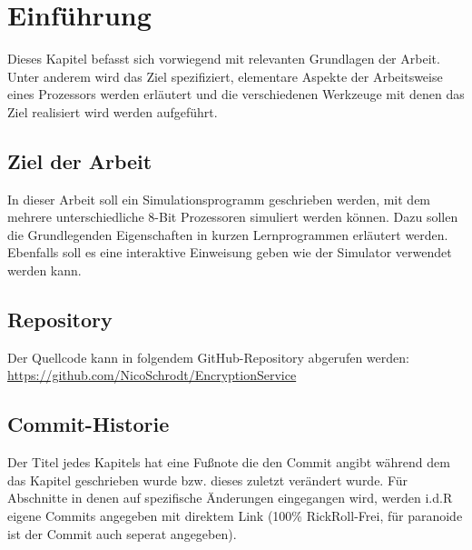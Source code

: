 \documentclass[12pt]{article}
\begin{document}
\clearpairofpagestyles
\clearmainofpairofpagestyles

\ihead[]{\leftmark} %

\cfoot[\pagemark]{\pagemark} %



\section{Einführung}
Dieses Kapitel befasst sich vorwiegend mit relevanten Grundlagen der Arbeit. Unter anderem wird das Ziel spezifiziert, elementare Aspekte der Arbeitsweise eines Prozessors werden erläutert und die verschiedenen Werkzeuge mit denen das Ziel realisiert wird werden aufgeführt.

\subsection{Ziel der Arbeit}
In dieser Arbeit soll ein Simulationsprogramm geschrieben werden, mit dem mehrere unterschiedliche 8-Bit Prozessoren simuliert werden können. Dazu sollen die Grundlegenden Eigenschaften in kurzen Lernprogrammen erläutert werden. Ebenfalls soll es eine interaktive Einweisung geben wie der Simulator verwendet werden kann.

\subsection{Repository}
Der Quellcode kann in folgendem GitHub-Repository abgerufen werden:\\ \url{https://github.com/NicoSchrodt/EncryptionService}

\subsection{Commit-Historie}
Der Titel jedes Kapitels hat eine Fußnote die den Commit angibt während dem das Kapitel geschrieben wurde bzw. dieses zuletzt verändert wurde. Für Abschnitte in denen auf spezifische Änderungen eingegangen wird, werden i.d.R eigene Commits angegeben mit direktem Link (100\% RickRoll-Frei, für paranoide ist der Commit auch seperat angegeben).
\newpage
\end{document}
